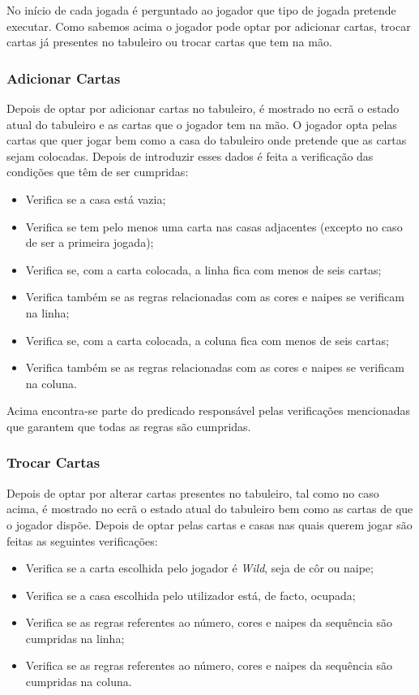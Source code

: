 \documentclass[a4paper]{article}
\begin{document}
	No início de cada jogada é perguntado ao jogador que tipo de jogada pretende executar. Como sabemos acima o jogador pode optar por adicionar cartas, trocar cartas já presentes no tabuleiro ou trocar cartas que tem na mão.

	\subsubsection{Adicionar Cartas}

	Depois de optar por adicionar cartas no tabuleiro, é mostrado no ecrã o estado atual do tabuleiro e as cartas que o jogador tem na mão. O jogador opta pelas cartas que quer jogar bem como a casa do tabuleiro onde pretende que as cartas sejam colocadas. Depois de introduzir esses dados é feita a verificação das condições que têm de ser cumpridas:

	\begin{itemize}
		\item 	Verifica se a casa está vazia;
		\item Verifica se tem pelo menos uma carta nas casas adjacentes (excepto no caso de ser a primeira jogada);
		\item Verifica se, com a carta colocada, a linha fica com menos de seis cartas;
		\item Verifica também se as regras relacionadas com as cores e naipes se verificam na linha;
		\item Verifica se, com a carta colocada, a coluna fica com menos de seis cartas;
		\item Verifica também se as regras relacionadas com as cores e naipes se verificam na coluna.
	\end{itemize}

	Acima encontra-se parte do predicado responsável pelas verificações mencionadas que garantem que todas as regras são cumpridas.

	\subsubsection{Trocar Cartas}

	Depois de optar por alterar cartas presentes no tabuleiro, tal como no caso acima, é mostrado no ecrã o estado atual do tabuleiro bem como as cartas de que o jogador dispõe. Depois de optar pelas cartas e casas nas quais querem jogar são feitas as seguintes verificações:

	\begin{itemize}
		\item Verifica se a carta escolhida pelo jogador é \textit{Wild}, seja de côr ou naipe;
		\item Verifica se a casa escolhida pelo utilizador está, de facto, ocupada;
		\item Verifica se as regras referentes ao número, cores e naipes da sequência são cumpridas na linha;
		\item Verifica se as regras referentes ao número, cores e naipes da sequência são cumpridas na coluna.
	\end{itemize}
\end{document}
